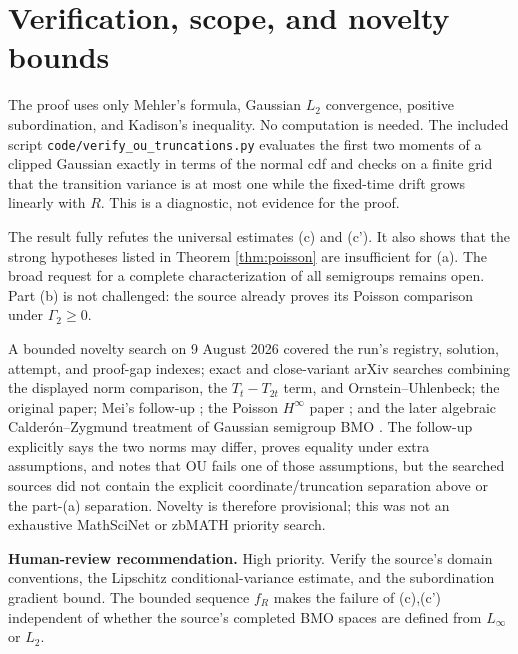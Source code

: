 \documentclass[11pt]{article}
\newcommand{\Ga}{\Gamma}
\begin{document}
\section{Verification, scope, and novelty bounds}

The proof uses only Mehler's formula, Gaussian $L_2$ convergence, positive
subordination, and Kadison's inequality.  No computation is needed.  The
included script \texttt{code/verify\_ou\_truncations.py} evaluates the first
two moments of a clipped Gaussian exactly in terms of the normal cdf and
checks on a finite grid that the transition variance is at most one while the
fixed-time drift grows linearly with $R$.  This is a diagnostic, not evidence
for the proof.

The result fully refutes the universal estimates (c) and (c').  It also shows
that the strong hypotheses listed in Theorem \ref{thm:poisson} are
insufficient for (a).  The broad request for a complete characterization of
all semigroups remains open.  Part (b) is not challenged: the source already
proves its Poisson comparison under $\Ga_2\geq0$.

A bounded novelty search on 9 August 2026 covered the run's registry,
solution, attempt, and proof-gap indexes; exact and close-variant arXiv
searches combining the displayed norm comparison, the $T_t-T_{2t}$ term, and
Ornstein--Uhlenbeck; the original paper; Mei's follow-up
\cite{MeiDuality}; the Poisson $H^\infty$ paper \cite{FergusonMeiSimanek};
and the later algebraic Calderón--Zygmund treatment of Gaussian semigroup BMO
\cite{JungeMeiParcetXia}.  The follow-up explicitly says the two norms may
differ, proves equality under extra assumptions, and notes that OU fails one
of those assumptions, but the searched sources did not contain the explicit
coordinate/truncation separation above or the part-(a) separation.  Novelty
is therefore provisional; this was not an exhaustive MathSciNet or zbMATH
priority search.

\textbf{Human-review recommendation.} High priority.  Verify the source's
domain conventions, the Lipschitz conditional-variance estimate, and the
subordination gradient bound.  The bounded sequence $f_R$ makes the failure
of (c),(c') independent of whether the source's completed BMO spaces are
defined from $L_\infty$ or $L_2$.
\end{document}

